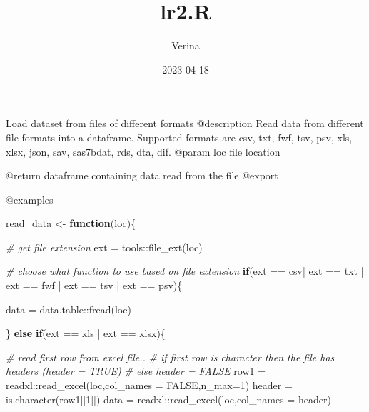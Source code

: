 \documentclass[
]{article}
\title{lr2.R}
\author{Verina}
\date{2023-04-18}
\newenvironment{Shaded}{\begin{snugshade}}{\end{snugshade}}
\newcommand{\AttributeTok}[1]{\textcolor[rgb]{0.77,0.63,0.00}{#1}}
\newcommand{\CommentTok}[1]{\textcolor[rgb]{0.56,0.35,0.01}{\textit{#1}}}
\newcommand{\ConstantTok}[1]{\textcolor[rgb]{0.00,0.00,0.00}{#1}}
\newcommand{\ControlFlowTok}[1]{\textcolor[rgb]{0.13,0.29,0.53}{\textbf{#1}}}
\newcommand{\DecValTok}[1]{\textcolor[rgb]{0.00,0.00,0.81}{#1}}
\newcommand{\FunctionTok}[1]{\textcolor[rgb]{0.00,0.00,0.00}{#1}}
\newcommand{\NormalTok}[1]{#1}
\newcommand{\OtherTok}[1]{\textcolor[rgb]{0.56,0.35,0.01}{#1}}
\newcommand{\SpecialCharTok}[1]{\textcolor[rgb]{0.00,0.00,0.00}{#1}}
\newcommand{\StringTok}[1]{\textcolor[rgb]{0.31,0.60,0.02}{#1}}
\begin{document}
\maketitle

Load dataset from files of different formats @description Read data from
different file formats into a dataframe. Supported formats are csv, txt,
fwf, tsv, psv, xls, xlsx, json, sav, sas7bdat, rds, dta, dif. @param loc
file location

@return dataframe containing data read from the file @export

@examples

\begin{Shaded}
\begin{Highlighting}[]
\NormalTok{read\_data }\OtherTok{\textless{}{-}} \ControlFlowTok{function}\NormalTok{(loc)\{}
  
  \CommentTok{\# get file extension}
\NormalTok{  ext }\OtherTok{=}\NormalTok{ tools}\SpecialCharTok{::}\FunctionTok{file\_ext}\NormalTok{(loc)}
  
  \CommentTok{\# choose what function to use based on file extension}
  \ControlFlowTok{if}\NormalTok{(ext }\SpecialCharTok{==} \StringTok{\textquotesingle{}csv\textquotesingle{}}\SpecialCharTok{|}\NormalTok{ ext }\SpecialCharTok{==} \StringTok{\textquotesingle{}txt\textquotesingle{}} \SpecialCharTok{|}\NormalTok{ ext }\SpecialCharTok{==} \StringTok{\textquotesingle{}fwf\textquotesingle{}} \SpecialCharTok{|}\NormalTok{ ext }\SpecialCharTok{==} \StringTok{\textquotesingle{}tsv\textquotesingle{}} \SpecialCharTok{|}\NormalTok{ ext }\SpecialCharTok{==} \StringTok{\textquotesingle{}psv\textquotesingle{}}\NormalTok{)\{}
    
\NormalTok{    data }\OtherTok{=}\NormalTok{ data.table}\SpecialCharTok{::}\FunctionTok{fread}\NormalTok{(loc)}
    
\NormalTok{  \} }\ControlFlowTok{else} \ControlFlowTok{if}\NormalTok{(ext }\SpecialCharTok{==} \StringTok{\textquotesingle{}xls\textquotesingle{}} \SpecialCharTok{|}\NormalTok{ ext }\SpecialCharTok{==} \StringTok{\textquotesingle{}xlsx\textquotesingle{}}\NormalTok{)\{}
    
    \CommentTok{\# read first row from excel file..}
    \CommentTok{\# if first row is character then the file has headers (header = TRUE)}
    \CommentTok{\# else header = FALSE }
\NormalTok{    row1 }\OtherTok{=}\NormalTok{ readxl}\SpecialCharTok{::}\FunctionTok{read\_excel}\NormalTok{(loc,}\AttributeTok{col\_names =} \ConstantTok{FALSE}\NormalTok{,}\AttributeTok{n\_max=}\DecValTok{1}\NormalTok{)}
\NormalTok{    header }\OtherTok{=} \FunctionTok{is.character}\NormalTok{(row1[[}\DecValTok{1}\NormalTok{]])}
\NormalTok{    data }\OtherTok{=}\NormalTok{ readxl}\SpecialCharTok{::}\FunctionTok{read\_excel}\NormalTok{(loc,}\AttributeTok{col\_names =}\NormalTok{ header)}
    

\end{Highlighting}
\end{Shaded}
\end{document}
